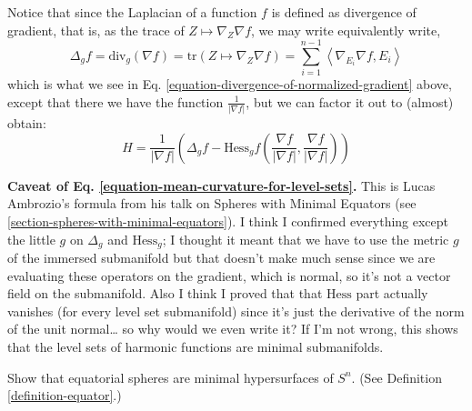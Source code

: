Notice that since the Laplacian of a function $f$ is defined as divergence of
gradient, that is, as the trace of $Z\mapsto \nabla_Z\nabla f$, 
we may write equivalently
write,
\begin{equation}
\label{equation-immersion-Laplacian}
\Delta_g f=\text{div}_g(\nabla f)=\text{tr}(Z \mapsto \nabla_Z\nabla f)
=\sum_{i=1}^{n-1}\left<\nabla_{E_i}\nabla f,E_i\right>
\end{equation}
which is what we see in Eq. 
\ref{equation-divergence-of-normalized-gradient} above, except that there we
have the function $\frac{1}{|\nabla f|}$, but we can factor it out to (almost)
obtain:
\begin{equation}
\label{equation-mean-curvature-for-level-sets}
H=\frac{1}{|\nabla f|}\left(\Delta_g f-\text{Hess}_gf
\left(\frac{\nabla f}{|\nabla f|},\frac{\nabla f}{|\nabla f|}\right)\right)
\end{equation}

{\bf Caveat of Eq. \ref{equation-mean-curvature-for-level-sets}.} This is
Lucas Ambrozio's formula from his talk on Spheres with Minimal Equators (see
\ref{section-spheres-with-minimal-equators}). I think I confirmed everything
except the little $g$ on $\Delta_g$ and 
$\text{Hess}_g$; I thought it meant that we have to use the metric $g$ of the
immersed submanifold but that doesn't make much sense since we are evaluating
these operators on the gradient, which is normal, so it's not a vector field on
the submanifold. Also I
think I proved that that $\text{Hess}$ part actually vanishes (for every level
set submanifold) since it's just
the derivative of the norm of the unit normal… so why would we even write it? If
I'm not wrong, this shows that the level sets of harmonic functions are minimal 
submanifolds.

\begin{example}
\label{example-equatorial-spheres}
Show that equatorial spheres are minimal hypersurfaces of $S^n$. (See 
Definition \ref{definition-equator}.)
\end{example}

